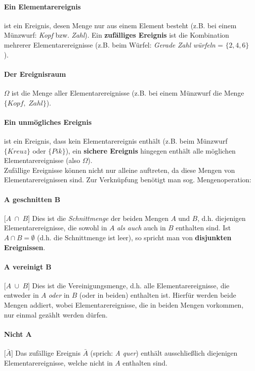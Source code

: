 \documentclass[a4paper]{article}
\begin{document}
\paragraph{Ein Elementarereignis} ist ein Ereignis, desen Menge nur aus einem Element besteht (z.B. bei einem Münzwurf: \textit{Kopf} bzw. \textit{Zahl}). Ein \textbf{zufälliges Ereignis} ist die Kombination mehrerer Elementarereignisse (z.B. beim Würfel: \textit{Gerade Zahl würfeln} = $\{2,4,6\}$).
\paragraph{Der Ereignisraum} $\Omega$ ist die Menge aller Elementarereignisse (z.B. bei einem Münzwurf die Menge $\{Kopf,\; Zahl\}$).
\paragraph{Ein unmögliches Ereignis} ist ein Ereignis, dass kein Elementarereignis enthält (z.B. beim Münzwurf $\{Kreuz\}$ oder $\{Pik\}$), ein \textbf{sichere Ereignis} hingegen enthält alle möglichen Elementarereignisse (also $\Omega$).\\

\noindent Zufällige Ereignisse können nicht nur alleine auftreten, da diese Mengen von Elementarereignissen sind. Zur Verknüpfung benötigt man sog. Mengenoperation:

\paragraph{A geschnitten B} [$A\; \cap\; B$]\; Dies ist die \textit{Schnittmenge} der beiden Mengen $A$ und $B$, d.h. diejenigen Elementarereignisse, die sowohl in $A$ \textit{als auch} auch in $B$ enthalten sind. Ist $A\cap B=\emptyset$ (d.h. die Schnittmenge ist leer), so spricht man von \textbf{disjunkten Ereignissen}. 

\paragraph{A vereinigt B} [$A\; \cup\; B$]\; Dies ist die Vereinigungsmenge, d.h. alle Elementarereignisse, die entweder in $A$ \textit{oder} in $B$ (oder in beiden) enthalten ist. Hierfür werden beide Mengen addiert, wobei Elementarereignisse, die in beiden Mengen vorkommen, nur einmal gezählt werden dürfen.

\paragraph{Nicht A} [$\bar A$]\; Das zufällige Ereignis $\bar A$ (sprich: \textit{A quer}) enthält ausschließlich diejenigen Elementarereignisse, welche nicht in $A$ enthalten sind.
\end{document}
